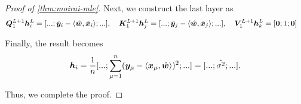 \begin{proof}[Proof of \cref{thm:moirai-mle}]
Next, we construct the last layer as
\begin{align*}
    \bm{Q}_1^{L+1} \bm{h}^L_i &= [ ... ; \tilde{\bm{y}}_i -  \langle \hat{\bm{w}}, \tilde{\bm{x}}_i \rangle  ; ... ], \quad \bm{K}^{L+1}_1 \bm{h}^L_j = [ ... ; \tilde{\bm{y}}_j -  \langle \hat{\bm{w}}, \tilde{\bm{x}}_j \rangle ;  ... ], \quad \bm{V}^{L+1}_1 \bm{h}_k^L = [ \bm{0} ; 1 ; \bm{0} ]
\end{align*}

Finally, the result becomes 
\begin{align*}
    \bm{h}_{i}
    =
    \frac{1}{n}
    [ ... ; \sum_{\mu=1}^n ( \bm{y}_\mu - \langle \bm{x}_\mu , \hat{\bm{w}} \rangle )^2; ... ]
    =
    [ ... ; \hat{\sigma^2}; ... ].
\end{align*}

Thus, we complete the proof.
\end{proof}


    
